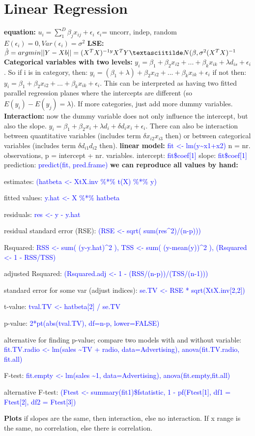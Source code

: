 \section{Linear Regression}
\textbf{equation: }$u_i = \sum_1^D \beta_j x_{ij} + \epsilon_i$
$\epsilon_i $= uncorr, indep, random $E(\epsilon_i) = 0, Var(\epsilon_i) = \sigma^2$
\textbf{LSE:} $\hat\beta = argmin ||Y-Xb|| = (X^TX)^{-1y}X^TY \textasciitilde N(\beta,\sigma^2(X^TX)^{-1}$
\textbf{Categorical variables with two levels: } $y_i = \beta_1 + \beta_2 x_{i2}+...+\beta_k x_{ik}+\lambda d_{is}+\epsilon_i$. So if i is in category, then: $y_i = (\beta_1+\lambda) + \beta_2x_{i2}+...+\beta_k x_{ik}+\epsilon_i$ if not then: $y_i = \beta_1 + \beta_2x_{i2}+...+\beta_k x_{ik}+\epsilon_i$. This can be interpreted as having two fitted parallel regression planes where the intercepts are different (so $E(y_i)-E(y_j) = \lambda$). If more categories, just add more dummy variables.
\textbf{Interaction: } now the dummy variable does not only influence the intercept, but also the slope. $y_i = \beta_1 + \beta_2x_i + \lambda d_i + \delta d_i x_i + \epsilon_i$. There can also be interaction between quantitative variables (includes term $\delta x_{i2}x_{i3}$ then) or between categorical variables (includes term $\delta d_{i1}d_{i2}$ then).
\textbf{linear model:} \textcolor{blue}{fit <- lm(y\textasciitilde x1+x2)}
n = nr. observations, p = intercept + nr. variables. intercept: \textcolor{blue}{fit\$coef[1]} slope: \textcolor{blue}{fit\$coef[1]} prediction: \textcolor{blue}{predict(fit, pred.frame)}
\textbf{we can reproduce all values by hand: }
\begin{inparaitem}
\item estimates: \textcolor{blue}{(hatbeta <- XtX.inv \%*\% t(X) \%*\% y) }
\item fitted values: \textcolor{blue}{y.hat <- X \%*\% hatbeta}
\item residuals: \textcolor{blue}{res <- y - y.hat}
\item residual standard error (RSE): \textcolor{blue}{(RSE <- sqrt( sum(res\^{}2)/(n-p)))}
\item Rsquared: \textcolor{blue}{RSS <- sum( (y-y.hat)\^{}2 ),
TSS <- sum( (y-mean(y))\^{}2 ),
(Rsquared <- 1 - RSS/TSS) }
\item adjusted Rsquared: \textcolor{blue}{(Rsquared.adj <- 1 - (RSS/(n-p))/(TSS/(n-1)))}
\item standard error for some var (adjust indices): \textcolor{blue}{se.TV <- RSE * sqrt(XtX.inv[2,2])}
\item t-value: \textcolor{blue}{tval.TV <- hatbeta[2] / se.TV}
\item p-value: \textcolor{blue}{2*pt(abs(tval.TV), df=n-p, lower=FALSE)}
\item alternative for finding p-value; compare two models with and without variable: 
\textcolor{blue}{fit.TV.radio <- lm(sales \textasciitilde TV + radio, data=Advertising), anova(fit.TV.radio, fit.all)}
\item F-test: \textcolor{blue}{fit.empty <- lm(sales \textasciitilde 1, data=Advertising),
anova(fit.empty,fit.all)} 
\item alternative F-test: \textcolor{blue}{(Ftest <- summary(fit1)\$fstatistic, 1 - pf(Ftest[1], df1 = Ftest[2], df2 = Ftest[3])}
\end{inparaitem}
\textbf{Plots} if slopes are the same, then interaction, else no interaction. If x range is the same, no correlation, else there is correlation. 
